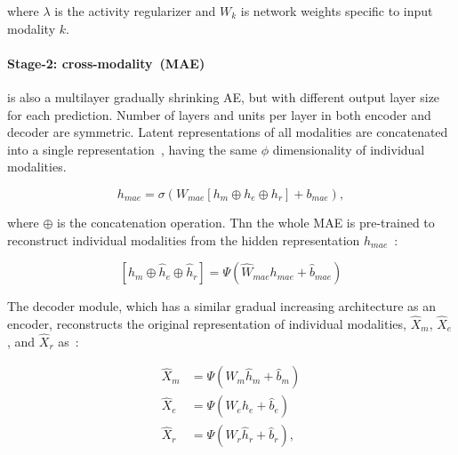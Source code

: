 \hspace*{3.5mm} where $\lambda$ is the activity regularizer and $W_{k}$ is network weights specific to input modality $k$. 

\paragraph{Stage-2: cross-modality~(MAE)}\hspace{-3mm} is also a multilayer gradually shrinking AE, but with different output layer size for each prediction. Number of layers and units per layer in both encoder and decoder are symmetric. Latent representations of all modalities are concatenated into a single representation~\cite{liu2016multimodal}, having the same $\phi$ dimensionality of individual modalities. 

\begin{equation}
    h_{mae}=\sigma\left(W_{mae}\left[h_{m} \oplus h_{e} \oplus h_{r}\right]+b_{mae}\right),
\end{equation}

\hspace*{3.5mm} where $\oplus$ is the concatenation operation. Thn the whole MAE is pre-trained to reconstruct individual modalities from the hidden representation $h_{mae}$~\cite{liu2016multimodal}:

\begin{equation}
    \left[\hat{h}_{m}\oplus \hat{h}_{e} \oplus \hat{h}_{r}
    \right]=\Psi\left(\hat W_{mae} h_{mae}+\hat {b}_{mae}\right)
\end{equation}

\hspace*{3.5mm} The decoder module, which has a similar gradual increasing architecture as an encoder, reconstructs the original representation of individual modalities, $\hat{X}_{m}$, $\hat{X}_{e}$, and $\hat{X}_{r}$ as~\cite{wang2018associativemulti}: 

\begin{equation}
    \begin{aligned}
        \hat{X}_{m} &=\Psi\left(\hat W_{m} \hat{h}_{m}+\hat{b}_{m}\right) \\
        \hat{X}_{e} &=\Psi\left(\hat W_{e} \hat{h}_{e}+\hat{b}_{e}\right) \\
        \hat{X}_{r} &=\Psi\left(\hat W_{r} \hat{h}_{r}+\hat{b}_{r}\right),
        \end{aligned}
\end{equation}

